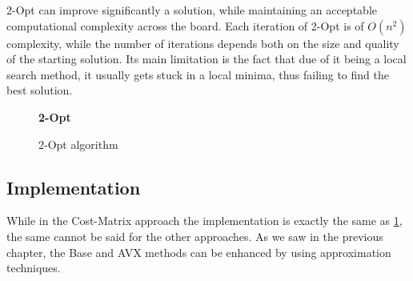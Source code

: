 2-Opt can improve significantly a solution, while maintaining an acceptable computational complexity across the board.
Each iteration of 2-Opt is of $O(n^2)$ complexity, while the number of iterations depends both on the size and quality of the starting solution.
Its main limitation is the fact that due of it being a local search method, it usually gets stuck in a local minima, thus failing to find the best solution.

\begin{figure}[htbp]
    \textbf{2-Opt} \\
    \begin{algorithm}[H]
        \BlankLine
    \end{algorithm}
    \caption{2-Opt algorithm} \label{fig:2OptPseudocode}
\end{figure}

\subsection{Implementation}

While in the Cost-Matrix approach the implementation is exactly the same as \figurename{ \ref{fig:2OptPseudocode}}, the same cannot be said for the other approaches.
As we saw in the previous chapter, the Base and AVX methods can be enhanced by using approximation techniques.


